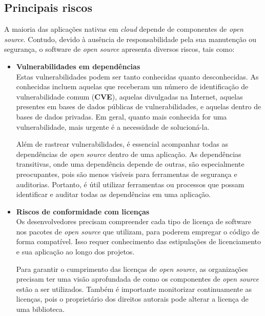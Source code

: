 \subsection{Principais riscos}
A maioria das aplicações nativas em \textit{cloud} depende de componentes de \textit{open source}. Contudo, devido à ausência de responsabilidade pela sua manutenção ou segurança, o software de \textit{open source} apresenta diversos riscos, tais como:
\begin{itemize}

  \item \textbf{Vulnerabilidades em dependências}\\
  Estas vulnerabilidades podem ser tanto conhecidas quanto desconhecidas. As conhecidas incluem aquelas que receberam um número de identificação de vulnerabilidade comum (\textbf{CVE}), aquelas divulgadas na Internet, aquelas presentes em bases de dados públicas de vulnerabilidades, e aquelas dentro de bases de dados privadas. Em geral, quanto mais conhecida for uma vulnerabilidade, mais urgente é a necessidade de solucioná-la.
  \par \vspace{6pt}
  Além de rastrear vulnerabilidades, é essencial acompanhar todas as dependências de \textit{open source} dentro de uma aplicação. As dependências transitivas, onde uma dependência depende de outras, são especialmente preocupantes, pois são menos visíveis para ferramentas de segurança e auditorias. Portanto, é útil utilizar ferramentas ou processos que possam identificar e auditar todas as dependências em uma aplicação.

  \item \textbf{Riscos de conformidade com licenças}\\
  Os desenvolvedores precisam compreender cada tipo de licença de software nos pacotes de \textit{open source} que utilizam, para poderem empregar o código de forma compatível. Isso requer conhecimento das estipulações de licenciamento e sua aplicação ao longo dos projetos.
  \par \vspace{6pt}
  Para garantir o cumprimento das licenças de \textit{open source}, as organizações precisam ter uma visão aprofundada de como os componentes de \textit{open source} estão a ser utilizados. Também é importante monitorizar continuamente as licenças, pois o proprietário dos direitos autorais pode alterar a licença de uma biblioteca.
  

\end{itemize}
